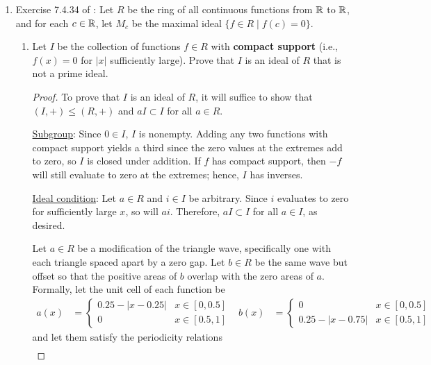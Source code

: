\documentclass[../psets.tex]{subfiles}
\begin{document}
\begin{enumerate}[resume]
    \item Exercise 7.4.34 of \textcite{bib:DummitFoote}: Let $R$ be the ring of all continuous functions from $\mathbb{R}$ to $\mathbb{R}$, and for each $c\in\mathbb{R}$, let $M_c$ be the maximal ideal $\{f\in R\mid f(c)=0\}$.
    \begin{enumerate}[label={\textbf{(\alph*)}}]
        \item Let $I$ be the collection of functions $f\in R$ with \textbf{compact support} (i.e., $f(x)=0$ for $|x|$ sufficiently large). Prove that $I$ is an ideal of $R$ that is not a prime ideal.
        \begin{proof}
            To prove that $I$ is an ideal of $R$, it will suffice to show that $(I,+)\leq(R,+)$ and $aI\subset I$ for all $a\in R$.\par
            \underline{Subgroup}: Since $0\in I$, $I$ is nonempty. Adding any two functions with compact support yields a third since the zero values at the extremes add to zero, so $I$ is closed under addition. If $f$ has compact support, then $-f$ will still evaluate to zero at the extremes; hence, $I$ has inverses.\par
            \underline{Ideal condition}: Let $a\in R$ and $i\in I$ be arbitrary. Since $i$ evaluates to zero for sufficiently large $x$, so will $ai$. Therefore, $aI\subset I$ for all $a\in I$, as desired.\par\smallskip
            Let $a\in R$ be a modification of the triangle wave, specifically one with each triangle spaced apart by a zero gap. Let $b\in R$ be the same wave but offset so that the positive areas of $b$ overlap with the zero areas of $a$. Formally, let the unit cell of each function be
            \begin{align*}
                a(x) &=
                \begin{cases}
                    0.25-|x-0.25| & x\in[0,0.5]\\
                    0 & x\in[0.5,1]
                \end{cases}&
                b(x) &=
                \begin{cases}
                    0 & x\in[0,0.5]\\
                    0.25-|x-0.75| & x\in[0.5,1]
                \end{cases}
            \end{align*}
            and let them satisfy the periodicity relations
            \begin{align*}

\end{align*}
\end{proof}
\end{enumerate}
\end{enumerate}
\end{document}
